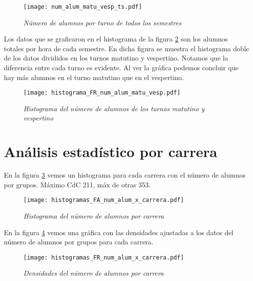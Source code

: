 \begin{figure}[H]
\centering
\texttt{[image: num\_alum\_matu\_vesp\_ts.pdf]} %
\caption{\textit{Número de alumnos por turno de todos los semestres}}\label{NumAlTotal_MatuVesp_ts}
\end{figure}



Los datos que se graficaron en el histograma de la figura \ref{histNumAlTotal_MatuVesp} son los alumnos totales por hora de cada semestre. En dicha figura se muestra el histograma doble de los datos divididos en los turnos matutino y vespertino. Notamos que la diferencia entre cada turno es evidente. Al ver la gráfica podemos concluir que hay más alumnos en el turno matutino que en el vespertino.

\begin{figure}[H]
\centering
\texttt{[image: histograma\_FR\_num\_alum\_matu\_vesp.pdf]} %
\caption{\textit{Histograma del número de alumnos de los turnos matutino y vespertino}}\label{histNumAlTotal_MatuVesp}
\end{figure}


\section{Análisis estadístico por carrera}

En la figura \ref{histFAnumAl_x_carrera} vemos un histograma para cada carrera con el número de alumnos por grupos. Máximo CdC 211, máx de otras 353.

\begin{figure}[H]
\centering
\texttt{[image: histogramas\_FA\_num\_alum\_x\_carrera.pdf]} %
\caption{\textit{Histograma del número de alumnos por carrera}}\label{histFAnumAl_x_carrera}
\end{figure}


En la figura \ref{histFRnumAl_x_carrera} vemos una gráfica con las densidades ajustadas a los datos del número de alumnos por grupos para cada carrera.

\begin{figure}[H]
\centering
\texttt{[image: histogramas\_FR\_num\_alum\_x\_carrera.pdf]} %
\caption{\textit{Densidades del número de alumnos por carrera}}\label{histFRnumAl_x_carrera}
\end{figure}



